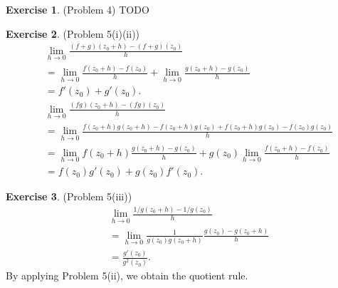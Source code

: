 \documentclass[12pt, psamsfonts]{amsart}
\theoremstyle{definition}
\newtheorem*{exer}{Exercise}
\theoremstyle{remark}
\numberwithin{equation}{section}
\begin{document}
\begin{exer}{(Problem 4)}
  TODO
\end{exer}

\begin{exer}{(Problem 5(i)(ii))}
  \begin{align*}
    &\lim_{h \rightarrow 0} \frac{(f + g)(z_0 + h) - (f + g)(z_0)}{h} \\
      &= \lim_{h \rightarrow 0} \frac{f(z_0 + h) - f(z_0)}{h} + \lim_{h \rightarrow 0} \frac{g(z_0 + h) - g(z_0)}{h} \\
      &= f'(z_0) + g'(z_0). \\
    &\lim_{h \rightarrow 0} \frac{(fg)(z_0 + h) - (fg)(z_0)}{h} \\
      &= \lim_{h \rightarrow 0} \frac{f(z_0 + h)g(z_0 + h) - f(z_0 + h)g(z_0) + f(z_0 + h)g(z_0) - f(z_0)g(z_0)}{h} \\
      &= \lim_{h \rightarrow 0} f(z_0 + h)\frac{g(z_0 + h) - g(z_0)}{h} + g(z_0)\lim_{h \rightarrow 0}\frac{f(z_0 + h) - f(z_0)}{h} \\
      &= f(z_0)g'(z_0) + g(z_0)f'(z_0).
  \end{align*}
\end{exer}

\begin{exer}{(Problem 5(iii))}
  \begin{align*}
    &\lim_{h \rightarrow 0} \frac{1/g(z_0 + h) - 1 / g(z_0)}{h} \\
      &= \lim_{h \rightarrow 0} \frac{1}{g(z_0)g(z_0+h)} \frac{g(z_0) - g(z_0 + h)}{h} \\
      &= \frac{g'(z_0)}{g^2(z_0)}.
  \end{align*}
  By applying Problem 5(ii), we obtain the quotient rule.
\end{exer}
\end{document}
